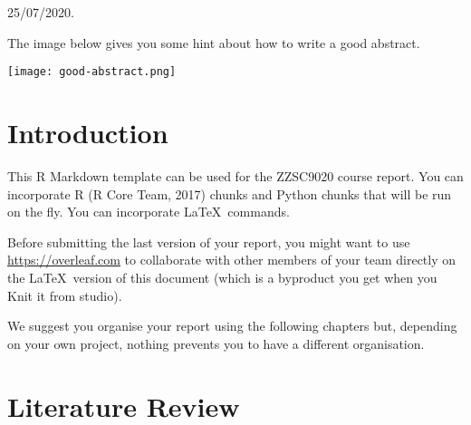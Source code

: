\documentclass[mstat,12pt]{unswthesis}
\begin{document}
{\bigskip\bigskip\bigskip\noindent} 25/07/2020.




The image below gives you some hint about how to write a good abstract.

\par

\bigskip \texttt{[image: good-abstract.png]}



\afterpreface





%
%






\hypertarget{introduction}{%
\chapter{Introduction}\label{introduction}}

This R Markdown template can be used for the ZZSC9020 course report. You
can incorporate R (R Core Team, 2017) chunks and Python chunks that will
be run on the fly. You can incorporate \LaTeX~commands.

\bigskip

Before submitting the last version of your report, you might want to use
\url{https://overleaf.com} to collaborate with other members of your
team directly on the \LaTeX~version of this document (which is a
byproduct you get when you Knit it from studio).

\bigskip

We suggest you organise your report using the following chapters but,
depending on your own project, nothing prevents you to have a different
organisation.

\hypertarget{literature-review}{%
\chapter{Literature Review}\label{literature-review}}
\end{document}
